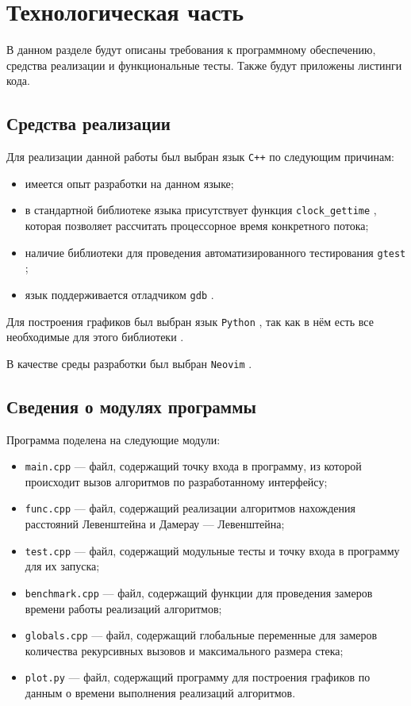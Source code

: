 \section{Технологическая часть}

В данном разделе будут описаны требования к программному обеспечению, средства реализации и функциональные тесты.
Также будут приложены листинги кода.

\subsection{Средства реализации}

Для реализации данной работы был выбран язык \texttt{C++} \cite{isocpp} по следующим причинам:
\begin{itemize}
    \item имеется опыт разработки на данном языке;
    \item в стандартной библиотеке языка присутствует функция \texttt{clock\_gettime} \cite{cpptime}, которая позволяет рассчитать процессорное время конкретного потока;
    \item наличие библиотеки для проведения автоматизированного тестирования \texttt{gtest} \cite{gtest};
    \item язык поддерживается отладчиком \texttt{gdb} \cite{gdb}.
\end{itemize}

Для построения графиков был выбран язык \texttt{Python} \cite{python}, так как в нём есть все необходимые для этого библиотеки \cite{pd} \cite{np} \cite{mpl}.

В качестве среды разработки был выбран \texttt{Neovim} \cite{nvim}. %

\subsection{Сведения о модулях программы}

Программа поделена на следующие модули:
\begin{itemize}
    \item \texttt{main.cpp} --- файл, содержащий точку входа в программу, из которой происходит вызов алгоритмов по разработанному интерфейсу;
    \item \texttt{func.cpp} --- файл, содержащий реализации алгоритмов нахождения расстояний Левенштейна и Дамерау --- Левенштейна;
    \item \texttt{test.cpp} --- файл, содержащий модульные тесты и точку входа в программу для их запуска;
    \item \texttt{benchmark.cpp} --- файл, содержащий функции для проведения замеров времени работы реализаций алгоритмов;
    \item \texttt{globals.cpp} --- файл, содержащий глобальные переменные для замеров количества рекурсивных вызовов и максимального размера стека;
    \item \texttt{plot.py} --- файл, содержащий программу для построения графиков по данным о времени выполнения реализаций алгоритмов.
\end{itemize}

